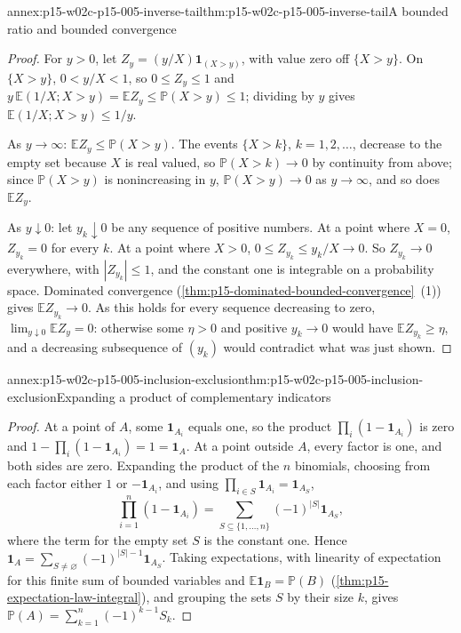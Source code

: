 \begin{annexitem}{annex:p15-w02c-p15-005-inverse-tail}{thm:p15-w02c-p15-005-inverse-tail}{A bounded ratio and bounded convergence}
\begin{proof}
For \(y>0\), let \(Z_y=(y/X)\mathbf1_{(X>y)}\), with value zero off
\(\{X>y\}\). On \(\{X>y\}\), \(0<y/X<1\), so \(0\leq Z_y\leq1\) and
\(y\,\mathbb E(1/X;X>y)=\mathbb EZ_y\leq\mathbb P(X>y)\leq1\); dividing by
\(y\) gives \(\mathbb E(1/X;X>y)\leq1/y\).

As \(y\to\infty\): \(\mathbb EZ_y\leq\mathbb P(X>y)\). The events
\(\{X>k\}\), \(k=1,2,\ldots\), decrease to the empty set because \(X\)
is real valued, so \(\mathbb P(X>k)\to0\) by continuity from above;
since \(\mathbb P(X>y)\) is nonincreasing in \(y\),
\(\mathbb P(X>y)\to0\) as \(y\to\infty\), and so does
\(\mathbb EZ_y\).

As \(y\downarrow0\): let \(y_k\downarrow0\) be any sequence of positive
numbers. At a point where \(X=0\), \(Z_{y_k}=0\) for every \(k\). At a
point where \(X>0\), \(0\leq Z_{y_k}\leq y_k/X\to0\). So
\(Z_{y_k}\to0\) everywhere, with \(|Z_{y_k}|\leq1\), and the constant one
is integrable on a probability space. Dominated convergence
(\cref{thm:p15-dominated-bounded-convergence}~(1)) gives
\(\mathbb EZ_{y_k}\to0\). As this holds for every sequence decreasing to
zero, \(\lim_{y\downarrow0}\mathbb EZ_y=0\): otherwise some
\(\eta>0\) and positive \(y_k\to0\) would have
\(\mathbb EZ_{y_k}\geq\eta\), and a decreasing subsequence of
\((y_k)\) would contradict what was just shown.
\end{proof}
\end{annexitem}

\begin{annexitem}{annex:p15-w02c-p15-005-inclusion-exclusion}{thm:p15-w02c-p15-005-inclusion-exclusion}{Expanding a product of complementary indicators}
\begin{proof}
At a point of \(A\), some \(\mathbf1_{A_i}\) equals one, so the product
\(\prod_i(1-\mathbf1_{A_i})\) is zero and
\(1-\prod_i(1-\mathbf1_{A_i})=1=\mathbf1_A\). At a point outside \(A\),
every factor is one, and both sides are zero. Expanding the product of
the \(n\) binomials, choosing from each factor either \(1\) or
\(-\mathbf1_{A_i}\), and using
\(\prod_{i\in S}\mathbf1_{A_i}=\mathbf1_{A_S}\),
\[
 \prod_{i=1}^n(1-\mathbf1_{A_i})
 =\sum_{S\subseteq\{1,\ldots,n\}}(-1)^{|S|}\mathbf1_{A_S},
\]
where the term for the empty set \(S\) is the constant one. Hence
\(\mathbf1_A=\sum_{S\neq\varnothing}(-1)^{|S|-1}\mathbf1_{A_S}\). Taking
expectations, with linearity of expectation for this finite sum of
bounded variables and \(\mathbb E\mathbf1_B=\mathbb P(B)\)
(\cref{thm:p15-expectation-law-integral}), and grouping the sets \(S\)
by their size \(k\), gives
\(\mathbb P(A)=\sum_{k=1}^n(-1)^{k-1}S_k\).
\end{proof}
\end{annexitem}


